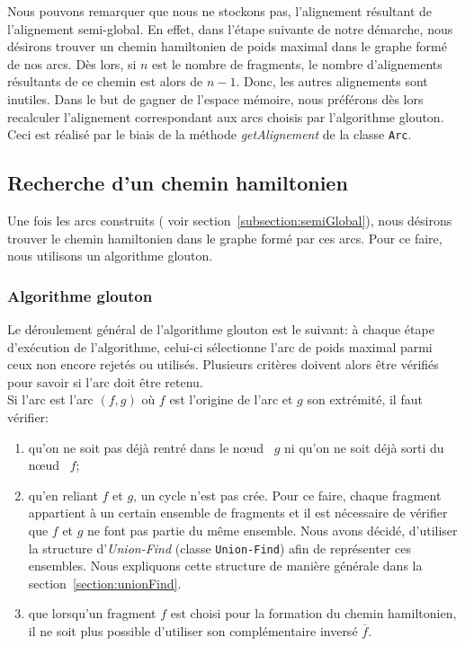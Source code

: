 Nous pouvons remarquer que nous ne stockons pas, l'alignement résultant de l'alignement semi-global. En effet, dans l'étape suivante de notre démarche, nous désirons trouver un chemin hamiltonien de poids maximal dans le graphe formé de nos arcs. Dès lors, si $n$ est le nombre de fragments, le nombre d'alignements résultants de ce chemin est alors de $n-1$. Donc, les autres alignements sont inutiles. Dans le but de gagner de l'espace mémoire, nous préférons dès lors recalculer l'alignement correspondant aux arcs choisis par l'algorithme glouton. Ceci est réalisé par le biais de la méthode \emph{getAlignement} de la classe \verb|Arc|.


\subsection{Recherche d'un chemin hamiltonien}
\label{subsection:greedy}

Une fois les arcs construits ( voir section~\ref{subsection:semiGlobal}), nous désirons trouver le chemin hamiltonien dans le graphe formé par ces arcs. Pour ce faire, nous utilisons un algorithme glouton.

\subsubsection{Algorithme glouton}

Le déroulement général de l'algorithme glouton est le suivant: à chaque étape d'exécution de l'algorithme, celui-ci sélectionne l'arc de poids maximal parmi ceux non encore rejetés ou utilisés. Plusieurs critères doivent alors être vérifiés pour savoir si l'arc doit être retenu. \\

Si l'arc est l'arc $(f,g)$ où $f$ est l'origine de l'arc et $g$ son extrémité, il faut vérifier:
\begin{enumerate}
 \item qu'on ne soit pas déjà rentré dans le \og n\oe{}ud \fg~$g$ ni qu'on ne soit déjà sorti du \og n\oe{}ud \fg~$f$;
 \item qu'en reliant $f$ et $g$, un cycle n'est pas crée. Pour ce faire, chaque fragment appartient à un certain ensemble de fragments et il est nécessaire de vérifier que $f$ et $g$ ne font pas partie du même ensemble. Nous avons décidé, d'utiliser la structure d'\emph{Union-Find} (classe \verb|Union-Find|) afin de représenter ces ensembles. Nous expliquons cette structure de manière générale dans la section~\ref{section:unionFind}.
 \item que lorsqu'un fragment $f$ est choisi pour la formation du chemin hamiltonien, il ne soit plus possible d'utiliser son complémentaire inversé $\overline{f}$. \\
\end{enumerate}

